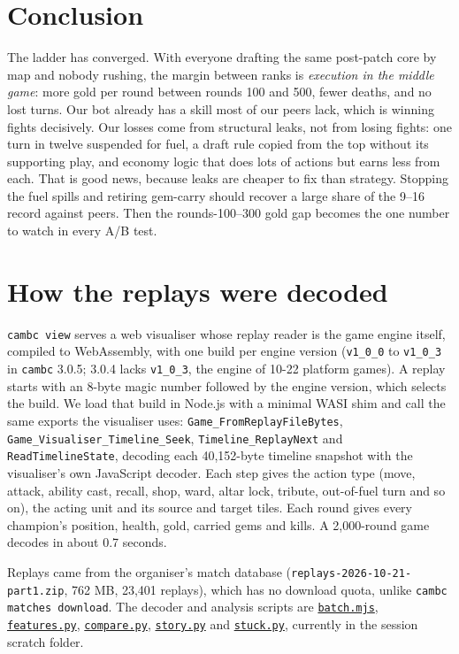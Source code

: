 \documentclass[11pt,a4paper]{article}
\newcommand{\viz}{file:///private/tmp/claude-501/-Users-tristanbasri-Desktop-Code-cambridge-battlecode-s2/b3f4cb6b-e46a-405f-957c-42c44c05c8dc/scratchpad/viz2}
\begin{document}
\section*{Conclusion}

The ladder has converged. With everyone drafting the same post-patch core by map and nobody rushing, the margin between ranks is \emph{execution in the middle game}: more gold per round between rounds 100 and 500, fewer deaths, and no lost turns. Our bot already has a skill most of our peers lack, which is winning fights decisively. Our losses come from structural leaks, not from losing fights: one turn in twelve suspended for fuel, a draft rule copied from the top without its supporting play, and economy logic that does lots of actions but earns less from each. That is good news, because leaks are cheaper to fix than strategy. Stopping the fuel spills and retiring gem-carry should recover a large share of the 9--16 record against peers. Then the rounds-100--300 gold gap becomes the one number to watch in every A/B test.

\appendix
\section{How the replays were decoded}
\label{app:replays}

\texttt{cambc view} serves a web visualiser whose replay reader is the game engine itself, compiled to WebAssembly, with one build per engine version (\texttt{v1\_0\_0} to \texttt{v1\_0\_3} in \texttt{cambc} 3.0.5; 3.0.4 lacks \texttt{v1\_0\_3}, the engine of 10-22 platform games). A replay starts with an 8-byte magic number followed by the engine version, which selects the build. We load that build in Node.js with a minimal WASI shim and call the same exports the visualiser uses: \texttt{Game\_FromReplayFileBytes}, \texttt{Game\_Visualiser\_Timeline\_Seek}, \texttt{Timeline\_ReplayNext} and \texttt{ReadTimelineState}, decoding each 40,152-byte timeline snapshot with the visualiser's own JavaScript decoder. Each step gives the action type (move, attack, ability cast, recall, shop, ward, altar lock, tribute, out-of-fuel turn and so on), the acting unit and its source and target tiles. Each round gives every champion's position, health, gold, carried gems and kills. A 2,000-round game decodes in about 0.7 seconds.

Replays came from the organiser's match database (\texttt{replays-2026-10-21-part1.zip}, 762 MB, 23,401 replays), which has no download quota, unlike \texttt{cambc matches download}. The decoder and analysis scripts are \href{\viz/batch.mjs}{\texttt{batch.mjs}}, \href{\viz/an/features.py}{\texttt{features.py}}, \href{\viz/an/compare.py}{\texttt{compare.py}}, \href{\viz/an/story.py}{\texttt{story.py}} and \href{\viz/an/stuck.py}{\texttt{stuck.py}}, currently in the session scratch folder.
\end{document}

